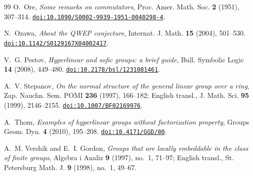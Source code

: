 \documentclass[11pt]{amsart}
\newcommand{\doi}[1]{\href{https://doi.org/#1}{\nolinkurl{doi:#1}}}
\begin{document}
\begin{thebibliography}{99}
O.~Ore, \emph{Some remarks on commutators},
Proc. Amer. Math. Soc. \textbf{2} (1951), 307--314.
\doi{10.1090/S0002-9939-1951-0040298-4}.

N.~Ozawa, \emph{About the QWEP conjecture},
Internat. J. Math. \textbf{15} (2004), 501--530.
\doi{10.1142/S0129167X04002417}.

V.~G. Pestov, \emph{Hyperlinear and sofic groups: a brief guide},
Bull. Symbolic Logic \textbf{14} (2008), 449--480.
\doi{10.2178/bsl/1231081461}.

A.~V. Stepanov, \emph{On the normal structure of the general linear
group over a ring}, Zap. Nauchn. Sem. POMI \textbf{236} (1997), 166--182;
English transl., J. Math. Sci. \textbf{95} (1999), 2146--2155.
\doi{10.1007/BF02169976}.

A.~Thom, \emph{Examples of hyperlinear groups without factorization
property}, Groups Geom. Dyn. \textbf{4} (2010), 195--208.
\doi{10.4171/GGD/80}.

A.~M. Vershik and E.~I. Gordon,
\emph{Groups that are locally embeddable in the class of finite groups},
Algebra i Analiz \textbf{9} (1997), no.~1, 71--97; English transl.,
St. Petersburg Math. J. \textbf{9} (1998), no.~1, 49--67.

\end{thebibliography}
\end{document}
